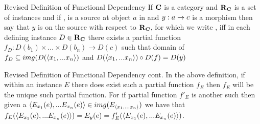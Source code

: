 \documentclass[xcolor=pst,dvips]{beamer}
\begin{document}
\begin{frame}{Revised Definition of Functional Dependency}
If $\textbf{C}$ is a category and $\textbf{R}_{\textbf{C}}$ is a set of instances and if 
,
is a source at object $a$ in \catcw and $y: a \rightarrow c$ is a morphism
then say that $y$ is  on the source \xnset
with respect to $\textbf{R}_{\textbf{C}}$, 
for which  we write  , 
iff in each defining instance $D \in \textbf{R}_{\textbf{C}}$ there exists a  partial 
function $f_D: D(b_1) \times ... \times D(b_n) \rightarrow D(c)$ 
such that 
domain of $f_D \subseteq img(D(\langle x_1,... x_n \rangle)$ 
and  
$D(\langle x_1,...x_n\rangle) \circ D(f) = D(y)$

\begin{center}
\end{center}
\end{frame}

\begin{frame}{Revised Definition of Functional Dependency cont.}
\medskip
In the above definition, if within an instance $E$ there does exist such a partial function $f_E$ then $f_E$ will be the unique such partial function. For if partial function $f'_E$ is another such then given a $\langle E_{x_1}(e),...E_{x_n}(e)\rangle \in img(E_{\langle x_1,...x_n\rangle})$
we have that $f_E(\langle E_{x_1}(e),...E_{x_n}(e)\rangle)=E_y(e)=f'_E(\langle E_{x_1}(e),...E_{x_n}(e)\rangle)$.
\end{frame}
\end{document}

